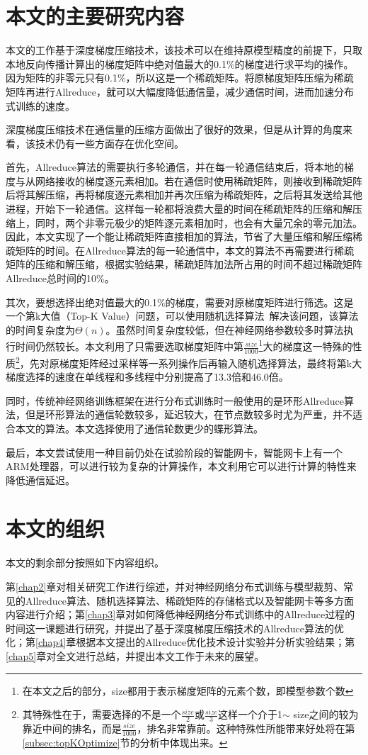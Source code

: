 \section{本文的主要研究内容}
本文的工作基于深度梯度压缩技术，该技术可以在维持原模型精度的前提下，只取本地反向传播计算出的梯度矩阵中绝对值最大的0.1\%的梯度进行求平均的操作。因为矩阵的非零元只有0.1\%，所以这是一个稀疏矩阵。将原梯度矩阵压缩为稀疏矩阵再进行Allreduce，就可以大幅度降低通信量，减少通信时间，进而加速分布式训练的速度。

深度梯度压缩技术在通信量的压缩方面做出了很好的效果，但是从计算的角度来看，该技术仍有一些方面存在优化空间。

首先，Allreduce算法的需要执行多轮通信，并在每一轮通信结束后，将本地的梯度与从网络接收的梯度逐元素相加。若在通信时使用稀疏矩阵，则接收到稀疏矩阵后将其解压缩，再将梯度逐元素相加并再次压缩为稀疏矩阵，之后将其发送给其他进程，开始下一轮通信。这样每一轮都将浪费大量的时间在稀疏矩阵的压缩和解压缩上，同时，两个非零元极少的矩阵逐元素相加时，也会有大量冗余的零元加法。因此，本文实现了一个能让稀疏矩阵直接相加的算法，节省了大量压缩和解压缩稀疏矩阵的时间。在Allreduce算法的每一轮通信中，本文的算法不再需要进行稀疏矩阵的压缩和解压缩，根据实验结果，稀疏矩阵加法所占用的时间不超过稀疏矩阵Allreduce总时间的10\%。

其次，要想选择出绝对值最大的0.1\%的梯度，需要对原梯度矩阵进行筛选。这是一个第k大值（Top-K Value）问题，可以使用随机选择算法~\cite{IntroToAlgo}解决该问题，该算法的时间复杂度为$\Theta(n)$。虽然时间复杂度较低，但在神经网络参数较多时算法执行时间仍然较长。本文利用了只需要选取梯度矩阵中第$\frac{size}{1000}$\footnote{在本文之后的部分，size都用于表示梯度矩阵的元素个数，即模型参数个数}大的梯度这一特殊的性质\footnote{其特殊性在于，需要选择的不是一个$\frac{size}{2}$或$\frac{size}{3}$这样一个介于1$\sim$ size之间的较为靠近中间的排名，而是$\frac{size}{1000}$，排名非常靠前。这种特殊性所能带来好处将在第\ref{subsec:topKOptimize}节的分析中体现出来。}，先对原梯度矩阵经过采样等一系列操作后再输入随机选择算法，最终将第k大梯度选择的速度在单线程和多线程中分别提高了13.3倍和46.0倍。

同时，传统神经网络训练框架在进行分布式训练时一般使用的是环形Allreduce算法，但是环形算法的通信轮数较多，延迟较大，在节点数较多时尤为严重，并不适合本文的算法。本文选择使用了通信轮数更少的蝶形算法。

最后，本文尝试使用一种目前仍处在试验阶段的智能网卡，智能网卡上有一个ARM处理器，可以进行较为复杂的计算操作，本文利用它可以进行计算的特性来降低通信延迟。

\section{本文的组织}

本文的剩余部分按照如下内容组织。

第\ref{chap2}章对相关研究工作进行综述，并对神经网络分布式训练与模型裁剪、常见的Allreduce算法、随机选择算法、稀疏矩阵的存储格式以及智能网卡等多方面内容进行介绍；第\ref{chap3}章对如何降低神经网络分布式训练中的Allreduce过程的时间这一课题进行研究，并提出了基于深度梯度压缩技术的Allreduce算法的优化；第\ref{chap4}章根据本文提出的Allreduce优化技术设计实验并分析实验结果；第\ref{chap5}章对全文进行总结，并提出本文工作于未来的展望。